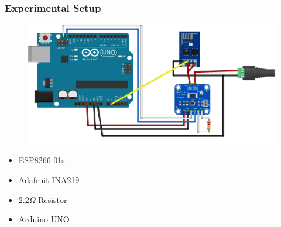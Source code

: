 \begin{frame}
    \frametitle{Experimental Setup}
	\centering
	    \begin{minipage}[t]{0.60 \textwidth}
	        \begin{figure}[H]
	            \centering
	            \vspace{20}
	            \includegraphics[width = 1.4 \linewidth]{fig/experimental_setup.png}
	        \end{figure}
	    \end{minipage}
	    \begin{minipage}[t]{0.30 \textwidth}
	    	\begin{itemize} 
	    		\item ESP8266-01s
	    		\item Adafruit INA219
	    		\item $2.2\Omega$ Resistor
	    		\item Arduino UNO
	    	\end{itemize}
	        \end{minipage}
\end{frame}